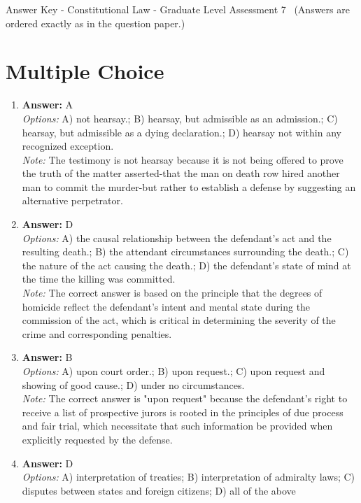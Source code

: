\documentclass[12pt]{article}
\begin{document}
\begin{center}
Answer Key - Constitutional Law - Graduate Level Assessment 7 \
\small (Answers are ordered exactly as in the question paper.)
\end{center}

\section*{Multiple Choice}
\begin{enumerate}[label=\arabic*.]
\item \textbf{Answer:} A
\\ \textit{Options:} A) not hearsay.; B) hearsay, but admissible as an admission.; C) hearsay, but admissible as a dying declaration.; D) hearsay not within any recognized exception.
\\ \textit{Note:} The testimony is not hearsay because it is not being offered to prove the truth of the matter asserted-that the man on death row hired another man to commit the murder-but rather to establish a defense by suggesting an alternative perpetrator.
\item \textbf{Answer:} D
\\ \textit{Options:} A) the causal relationship between the defendant's act and the resulting death.; B) the attendant circumstances surrounding the death.; C) the nature of the act causing the death.; D) the defendant's state of mind at the time the killing was committed.
\\ \textit{Note:} The correct answer is based on the principle that the degrees of homicide reflect the defendant's intent and mental state during the commission of the act, which is critical in determining the severity of the crime and corresponding penalties.
\item \textbf{Answer:} B
\\ \textit{Options:} A) upon court order.; B) upon request.; C) upon request and showing of good cause.; D) under no circumstances.
\\ \textit{Note:} The correct answer is "upon request" because the defendant's right to receive a list of prospective jurors is rooted in the principles of due process and fair trial, which necessitate that such information be provided when explicitly requested by the defense.
\item \textbf{Answer:} D
\\ \textit{Options:} A) interpretation of treaties; B) interpretation of admiralty laws; C) disputes between states and foreign citizens; D) all of the above

\end{enumerate}
\end{document}
